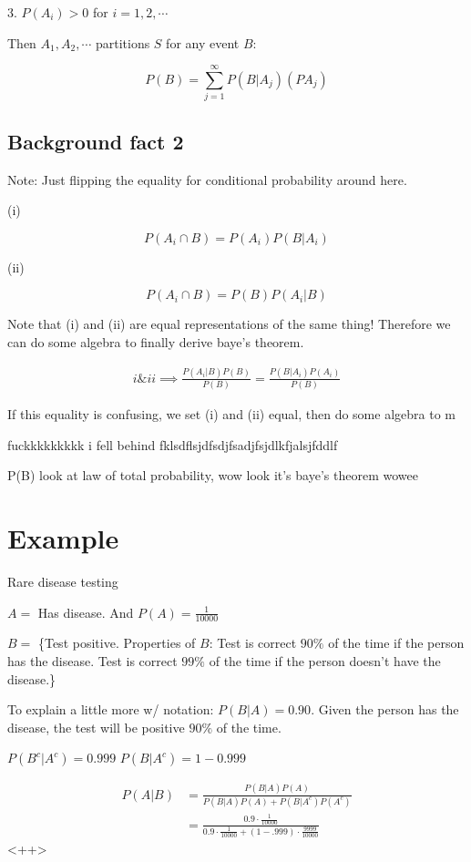 \documentclass[a4paper]{article}
\begin{document}
3. $P(A_i) > 0$ for $i=1,2,\cdots$

Then $A_1, A_2, \cdots$ partitions $S$ for any event $B$:

\[P(B) = \sum_{j=1}^{\infty}P(B|A_j)(PA_j)\]

\subsection{Background fact 2}

Note: Just flipping the equality for conditional probability around here.

(i)

\[P(A_i \cap B) = P(A_i)P(B|A_i)\]

(ii)

\[P(A_i \cap B) = P(B)P(A_i|B)\]

Note that (i) and (ii) are equal representations of the same thing! Therefore we can do some algebra to finally derive baye's theorem.

\begin{align*}
	i\&ii \implies \frac{P(A_i | B) P(B)}{P(B)} = \frac{P(B|A_i)P(A_i)}{P(B)}
\end{align*}

If this equality is confusing, we set (i) and (ii) equal, then do some algebra to m

fuckkkkkkkkk i fell behind fklsdflsjdfsdjfsadjfsjdlkfjalsjfddlf

P(B) look at law of total probability, wow look it's baye's theorem wowee

\section*{Example}

Rare disease testing 

$A = $ Has disease. And $P(A) = \frac{1}{10000}$

$B = $ \{Test positive. Properties of $B$: Test is correct $90\%$ of the time if the person has the disease. Test is correct $99\%$ of the time if the person doesn't have the disease.\}

To explain a little more w/ notation: $P(B | A) = 0.90$. Given the person has the disease, the test will be positive $90\%$ of the time.

$P(B^c|A^c) = 0.999$
$P(B|A^c) = 1-0.999$

\begin{align*}
	P(A|B) &= \frac{P(B|A) P(A)}{P(B|A) P(A) + P(B|A^c)P(A^c)} \\
	&= \frac{0.9 \cdot \frac{1}{10000}}{0.9 \cdot \frac{1}{10000} + (1-.999) \cdot \frac{9999}{10000}}
\end{align*}<++>
\end{document}
